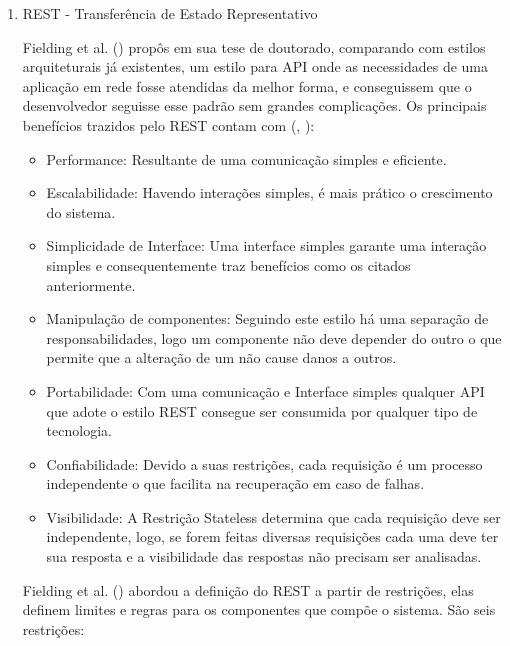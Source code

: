 \begin{enumerate}
  \item REST - Transferência de Estado Representativo
  
  Fielding et al. (\citeyear{fielding2000rest}) propôs em sua tese de doutorado, comparando com estilos arquiteturais já existentes, um estilo para API onde as necessidades de uma aplicação em rede fosse atendidas da melhor forma, e conseguissem que o desenvolvedor seguisse esse padrão sem grandes complicações. Os principais benefícios trazidos pelo REST contam com (\citeauthor{rest2018or}, \citeyear{rest2018or}):
  
  \begin{itemize}
    \item Performance: Resultante de uma comunicação simples e eficiente.
    \item Escalabilidade: Havendo interações simples, é mais prático o crescimento do sistema.
    \item Simplicidade de Interface: Uma interface simples garante uma interação simples e consequentemente traz benefícios como os citados anteriormente.
    \item Manipulação de componentes: Seguindo este estilo há uma separação de responsabilidades, logo um componente não deve depender do outro o que permite que a alteração de um não cause danos a outros.
    \item Portabilidade: Com uma comunicação e Interface simples qualquer API que adote o estilo REST consegue ser consumida por qualquer tipo de tecnologia.
    \item Confiabilidade: Devido a suas restrições, cada requisição é um processo independente o que facilita na recuperação em caso de falhas.
    \item Visibilidade: A Restrição Stateless determina que cada requisição deve ser independente, logo, se forem feitas diversas requisições cada uma deve ter sua resposta e a visibilidade das respostas não precisam ser analisadas.
  \end{itemize}
  
  Fielding et al. (\citeyear{fielding2000rest}) abordou a definição do REST a partir de restrições, elas definem limites e regras para os componentes que compõe o sistema. São seis restrições: 
  

\end{enumerate}
